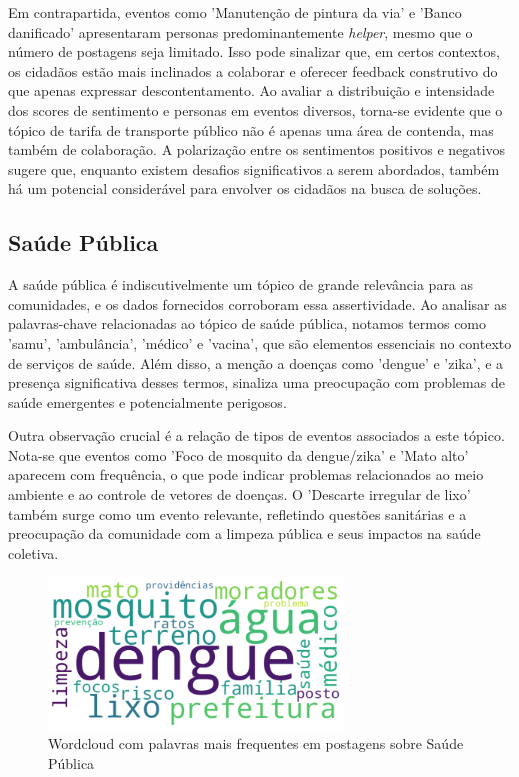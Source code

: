 Em contrapartida, eventos como 'Manutenção de pintura da via' e 'Banco danificado' apresentaram personas predominantemente \textit{helper}, mesmo que o número de postagens seja limitado. Isso pode sinalizar que, em certos contextos, os cidadãos estão mais inclinados a colaborar e oferecer feedback construtivo do que apenas expressar descontentamento. Ao avaliar a distribuição e intensidade dos scores de sentimento e personas em eventos diversos, torna-se evidente que o tópico de tarifa de transporte público não é apenas uma área de contenda, mas também de colaboração. A polarização entre os sentimentos positivos e negativos sugere que, enquanto existem desafios significativos a serem abordados, também há um potencial considerável para envolver os cidadãos na busca de soluções.

\subsection{Saúde Pública}

A saúde pública é indiscutivelmente um tópico de grande relevância para as comunidades, e os dados fornecidos corroboram essa assertividade. Ao analisar as palavras-chave relacionadas ao tópico de saúde pública, notamos termos como 'samu', 'ambulância', 'médico' e 'vacina', que são elementos essenciais no contexto de serviços de saúde. Além disso, a menção a doenças como 'dengue' e 'zika', e a presença significativa desses termos, sinaliza uma preocupação com problemas de saúde emergentes e potencialmente perigosos.

Outra observação crucial é a relação de tipos de eventos associados a este tópico. Nota-se que eventos como 'Foco de mosquito da dengue/zika' e 'Mato alto' aparecem com frequência, o que pode indicar problemas relacionados ao meio ambiente e ao controle de vetores de doenças. O 'Descarte irregular de lixo' também surge como um evento relevante, refletindo questões sanitárias e a preocupação da comunidade com a limpeza pública e seus impactos na saúde coletiva.

\begin{figure}[htb]
	\centering
	\includegraphics[width=0.7\textwidth]{images/wordcloud_public_health.png}
	\caption{Wordcloud com palavras mais frequentes em postagens sobre Saúde Pública}
	\label{fig:wordcloud_public_health}
\end{figure}

